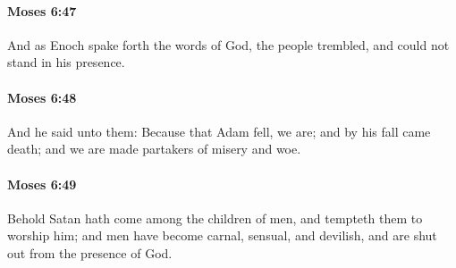 		\paragraph{Moses 6:47} %
			\label{MOSES-6-47}

			And as Enoch spake forth the words of God, the people trembled, and could not stand in his presence.


		\paragraph{Moses 6:48} %
			\label{MOSES-6-48}

			And he said unto them: Because that Adam fell, we are; and by his fall came death; and we are made partakers of misery and woe.


		\paragraph{Moses 6:49} %
			\label{MOSES-6-49}

			Behold Satan hath come among the children of men, and tempteth them to worship him; and men have become carnal, sensual, and devilish, and are shut out from the presence of God.


